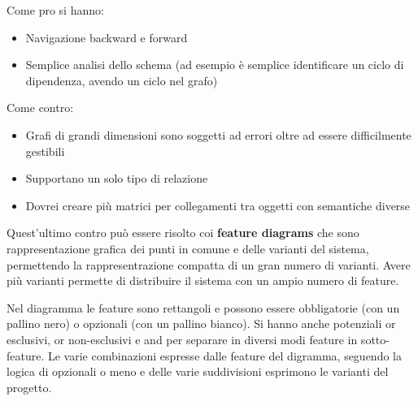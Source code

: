 Come pro si hanno:
\begin{itemize}
    \item Navigazione backward e forward
    \item Semplice analisi dello schema (ad esempio è semplice identificare un
          ciclo di dipendenza, avendo un ciclo nel grafo)
\end{itemize}
Come contro:
\begin{itemize}
    \item Grafi di grandi dimensioni sono soggetti ad errori oltre ad essere
          difficilmente gestibili
    \item Supportano un solo tipo di relazione
    \item Dovrei creare più matrici per collegamenti tra oggetti con semantiche
          diverse
\end{itemize}
Quest'ultimo contro può essere risolto coi \textbf{feature diagrams} che sono
rappresentazione grafica dei punti in comune e delle varianti del sistema, permettendo
la rappresentrazione compatta di un gran numero di varianti. Avere più varianti
permette di distribuire il sistema con un ampio numero di feature.

Nel diagramma le feature sono rettangoli e possono essere obbligatorie (con un
pallino nero) o opzionali (con un pallino bianco). Si hanno anche potenziali or
esclusivi, or non-esclusivi e and per separare in diversi modi feature in sotto-feature.
Le varie combinazioni espresse dalle feature del digramma, seguendo la logica di
opzionali o meno e delle varie suddivisioni esprimono le varianti del progetto.